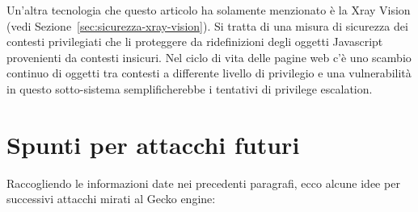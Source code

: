 \documentclass{sapthesis}
\newcommand{\refSection}[1]{Sezione~\ref{#1}}
\newcommand{\JS}{Javascript}
\begin{document}
    Un'altra tecnologia che questo articolo ha solamente menzionato è la Xray Vision (vedi \refSection{sec:sicurezza-xray-vision}).
    Si tratta di una misura di sicurezza dei contesti privilegiati che li proteggere da ridefinizioni
    degli oggetti \JS{} provenienti da contesti insicuri. Nel ciclo di vita delle pagine web c'è uno
    scambio continuo di oggetti tra contesti a differente livello di privilegio e una vulnerabilità
    in questo sotto-sistema semplificherebbe i tentativi di privilege escalation.

    \section{Spunti per attacchi futuri}
        Raccogliendo le informazioni date nei precedenti paragrafi, ecco alcune idee per successivi
        attacchi mirati al Gecko engine:
\end{document}
